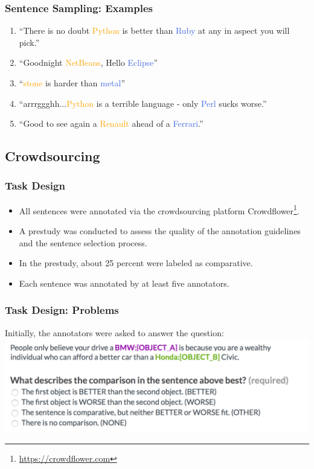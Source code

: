 \documentclass[11pt,aspectratio=169,usenames,dvipsnames]{beamer}
\begin{document}
    \begin{frame}[t]
        \frametitle{Sentence Sampling: Examples}
        \begin{enumerate}
            \item \enquote{There is no doubt \textcolor{orange}{Python} is better than \textcolor{RoyalBlue}{Ruby} at any in aspect you will pick.}
            \item \enquote{Goodnight \textcolor{orange}{NetBeans}, Hello \textcolor{RoyalBlue}{Eclipse}}
            \item \enquote{\textcolor{orange}{stone} is harder than \textcolor{RoyalBlue}{metal}}
            \item \enquote{arrrggghh...\textcolor{orange}{Python} is a terrible language - only \textcolor{RoyalBlue}{Perl} sucks worse.}
            \item \enquote{Good to see again a \textcolor{orange}{Renault} ahead of a \textcolor{RoyalBlue}{Ferrari}.}
        \end{enumerate}
    \end{frame}

    \subsection{Crowdsourcing}
    \frame{\subsectionpage}
    \begin{frame}[t]
        \frametitle{Task Design}
        \begin{itemize}
            \item All sentences were annotated via the crowdsourcing platform Crowdflower\footnote{\url{https://crowdflower.com}}.
            \item A prestudy was conducted to assess the quality of the annotation guidelines and the sentence selection process.
            \item In the prestudy, about 25 percent were labeled as comparative.
            \item Each sentence was annotated by at least five annotators.
        \end{itemize}

    \end{frame}

    \begin{frame}[t]
        \frametitle{Task Design: Problems}
        Initially, the annotators were asked to answer the question:
        \includegraphics[scale=0.3]{images/q1other}
    \end{frame}
\end{document}

